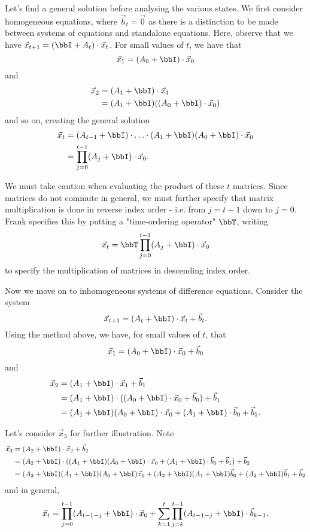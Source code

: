 \documentclass[a4paper, 12pt,oneside,openany]{book}
\begin{document}
Let's find a general solution before analysing the various states. We first consider homogeneous equations, where $\vec{b}_t=\vec{0}$ as there is a distinction to be made between systems of equations and standalone equations. Here, observe that we have $\vec{x}_{t+1} = (\bbI+A_t) \cdot \vec{x}_t$. For small values of $t$, we have that $$\vec{x}_1 = (A_0+\bbI) \cdot \vec{x}_0$$ and \begin{align*}\vec{x}_2 &= (A_1+\bbI) \cdot \vec{x}_1 \\ &= (A_1+\bbI)((A_0+\bbI)\cdot \vec{x}_0)  \end{align*} and so on, creating the general solution \begin{align*} \vec{x}_t &= (A_{t-1}+\bbI)\cdot \hdots \cdot (A_1+\bbI)(A_0+\bbI) \cdot \vec{x}_0 \\ &= \prod\limits_{j=0}^{t-1} (A_j+\bbI) \cdot \vec{x}_0. \end{align*} 

We must take caution when evaluating the product of these $t$ matrices. Since matrices do not commute in general, we must further specify that matrix multiplication is done in reverse index order - i.e. from $j=t-1$ down to $j=0$. Frank specifies this by putting a "time-ordering operator" $\bbT$, writing $$\vec{x}_t = \bbT \prod\limits_{j=0}^{t-1} (A_j+\bbI) \cdot \vec{x}_0$$ to specify the multiplication of matrices in descending index order.


Now we move on to inhomogeneous systems of difference equations. Consider the system $$\vec{x}_{t+1} = (A_t+\bbI)\cdot \vec{x}_t + \vec{b}_t.$$ Using the method above, we have, for small values of $t$, that $$\vec{x}_1 = (A_0+\bbI)\cdot \vec{x}_0 + \vec{b}_0$$ and \begin{align*} \vec{x}_2 &= (A_1+\bbI) \cdot \vec{x}_1+ \vec{b}_1 \\ &= (A_1+\bbI) \cdot ((A_0+\bbI)\cdot \vec{x}_0 + \vec{b}_0)+\vec{b}_1 \\ &= (A_1+\bbI)(A_0+\bbI) \cdot \vec{x}_0 + (A_1+\bbI) \cdot \vec{b}_0 + \vec{b}_1.\end{align*}

Let's consider $\vec{x}_3$ for further illustration. Note \begin{align*}\vec{x}_3 &= (A_2+\bbI) \cdot \vec{x}_2 +\vec{b}_2 \\ &= (A_2+\bbI) \cdot ((A_1+\bbI)(A_0+\bbI) \cdot \vec{x}_0 + (A_1+\bbI) \cdot \vec{b}_0 + \vec{b}_1) + \vec{b}_2 \\ &= (A_2+\bbI)(A_1+\bbI)(A_0+\bbI)\vec{x}_0+(A_2+\bbI)(A_1+\bbI) \vec{b}_0+(A_2+\bbI)\vec{b}_1+\vec{b}_2  \end{align*} and in general, $$\vec{x}_t = \prod\limits_{j=0}^{t-1} (A_{t-1-j}+\bbI) \cdot \vec{x}_0 + \sum\limits_{k=1}^t \prod\limits_{j=k}^{t-1} (A_{t-1-j}+\bbI) \cdot \vec{b}_{k-1}.$$
\end{document}

